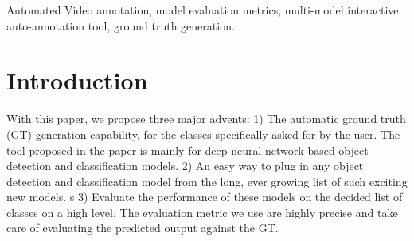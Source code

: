 \documentclass[conference]{IEEEtran}
\begin{document}
\begin{abstract}

\end{abstract}

\begin{IEEEkeywords}
Automated Video annotation, model evaluation metrics, multi-model interactive auto-annotation tool, ground truth generation.
\end{IEEEkeywords}

%
\IEEEpeerreviewmaketitle


\section{Introduction}

With this paper, we propose three major advents:
1) The automatic ground truth (GT) generation capability, for the classes specifically asked for by the user. The tool proposed in the paper is mainly for deep neural network based object detection and classification models.
2) An easy way to plug in any object detection and classification model from the long, ever growing list of such exciting new models. s
3) Evaluate the performance of these models on the decided list of classes on a high level. The evaluation metric we use are highly precise and take care of evaluating the predicted output against the GT.
\end{document}
